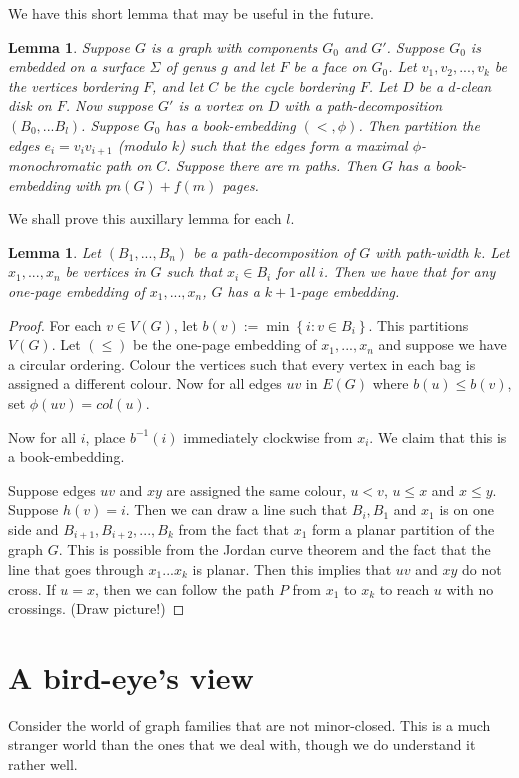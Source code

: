 \documentclass[]{article}
\newtheorem{lemma}[theorem]{Lemma}
\theoremstyle{definition}
\numberwithin{theorem}{section}
\numberwithin{equation}{section}
\begin{document}
We have this short lemma that may be useful in the future.
\begin{lemma}
	Suppose $G$ is a graph with components $G_0$ and $G'$. Suppose $G_0$ is embedded on a surface $\Sigma$ of genus $g$ and let $F$ be a face on $G_0$. Let $v_1, v_2, ..., v_k$ be the vertices bordering $F$, and let $C$ be the cycle bordering $F$. Let $D$ be a $d$-clean disk on $F$. Now suppose $G'$ is a vortex on $D$ with a path-decomposition $(B_0, ... B_l)$. Suppose $G_0$ has a book-embedding $(<, \phi)$. Then partition the edges $e_i = v_i v_{i + 1}$ (modulo $k$) such that the edges form a maximal $\phi$-monochromatic path on $C$. Suppose there are $m$ paths. Then $G$ has a book-embedding with $pn(G) + f(m)$ pages.
\end{lemma}
We shall prove this auxillary lemma for each $l$. 
\begin{lemma}
	Let $(B_1, ..., B_n)$ be a path-decomposition of $G$ with path-width $k$. Let $x_1, ..., x_n$ be vertices in $G$ such that $x_i \in B_i$ for all $i$. Then we have that for any one-page embedding of $x_1, ..., x_n$, $G$ has a $k + 1$-page embedding. 
\end{lemma}

\begin{proof}
	For each $v \in V(G)$, let $b(v) := \min \left\{ i : v \in B_i \right\}$. This partitions $V(G)$. Let $(\leq)$ be the one-page embedding of $x_1, ..., x_n$ and suppose we have a circular ordering. Colour the vertices such that every vertex in each bag is assigned a different colour. Now for all edges $uv$ in $E(G)$ where $b(u) \leq b(v) $, set $\phi(uv) = col(u)$. 
	
	Now for all $i$, place $b^{-1}(i)$ immediately clockwise from $x_i$. We claim that this is a book-embedding. 
	
	Suppose edges $uv$ and $xy$ are assigned the same colour, $u < v$, $u \leq x$ and $x \leq y$. Suppose $h(v) = i$. Then we can draw a line such that $B_i, B_1$ and $x_1$ is on one side and $B_{i + 1}, B_{i + 2}, ..., B_k$ from the fact that $x_1$ form a planar partition of the graph $G$. This is possible from the Jordan curve theorem and the fact that the line that goes through $x_1 ... x_k$ is planar. Then this implies that $uv$ and $xy$ do not cross. 
	If $u = x$, then we can follow the path $P$ from $x_1$ to $x_k$ to reach $u$ with no crossings. (Draw picture!)
\end{proof}

\section{A bird-eye's view}
Consider the world of graph families that are not minor-closed. This is a much stranger world than the ones that we deal with, though we do understand it rather well.
\end{document}
